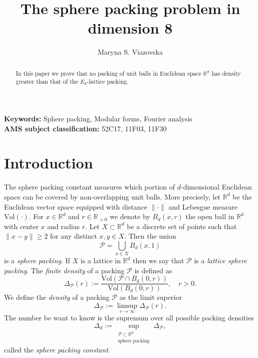 \documentclass{scrartcl}
\author{Maryna S. Viazovska }
\title{The sphere packing problem in dimension 8}
\newcommand{\R}{\mathbb{R}}
\begin{document}
\maketitle

\begin{abstract}
In this paper we prove that no packing of unit balls
in Euclidean space $\R^8$ has density greater than that of the $E_8$-lattice packing.
\end{abstract}

\noindent
\textbf{ Keywords:} Sphere packing, Modular forms, Fourier analysis\\
\textbf{ AMS subject classification:}  52C17, 11F03, 11F30

\section{Introduction}
The sphere packing constant measures which portion of $d$-dimensional Euclidean
space can be covered by non-overlapping unit balls. More precisely, let $\R^d$ be the Euclidean vector space equipped with distance $\|\cdot\|$ and Lebesgue measure $\mathrm{Vol}(\cdot)$. For $x\in\R^d$ and $r\in\R_{>0}$ we denote by $B_d(x,r)$ the open ball in $\R^d$ with center $x$ and radius $r$.
Let $X\subset \R^d$ be a discrete set of points such that $\|x-y\|\geq2$ for any distinct $x,y\in X$. Then the union
$$\mathcal{P}=\bigcup_{x\in X} B_d(x,1)$$ is a \emph{sphere packing}. If $X$ is a lattice in $\R^d$ then we say that $\mathcal{P}$ is a \emph{lattice sphere packing}. The \emph{finite density} of a packing $\mathcal{P}$ is defined as
$$\Delta_{\mathcal{P}}(r):=\frac{\mathrm{Vol}(\mathcal{P}\cap B_d(0,r))}{\mathrm{Vol}(B_d(0,r))},\quad r>0.$$
We define the \emph{density} of a packing $\mathcal{P}$ as the limit superior
$$\Delta_{\mathcal{P}}:=\limsup\limits_{r\to\infty}\Delta_{\mathcal{P}}(r). $$
The number be want to know is the supremum over all possible packing densities
$$\Delta_d:=\sup\limits_{\substack{\mathcal{P}\subset\R^d\\ \scriptscriptstyle\mathrm{sphere}\;\mathrm{packing}}}\Delta_{\mathcal{P}}, $$
                         called the \emph{sphere packing constant}.
\end{document}
